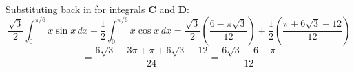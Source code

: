 \begin{Answer}[ref = fubini_2]
\begin{enumerate}
Substituting back in for integrals \textbf{C} and \textbf{D}:
$$\frac{\sqrt{3}}{2} \int_0^{\pi/6} x \sin{x}\,dx + \frac{1}{2} \int_0^{\pi/6} 
x \cos{x}\,dx = \frac{\sqrt{3}}{2} \left( \frac{6 - \pi \sqrt{3}}{12} \right) 
+ \frac{1}{2} \left( \frac{\pi + 6\sqrt{3}- 12}{12} \right)$$
$$= \frac{6 \sqrt{3} - 3\pi + \pi + 6\sqrt{3} - 12}{24} = \frac{6 \sqrt{3} - 6 
- \pi}{12}$$
\end{enumerate}
\end{Answer}



